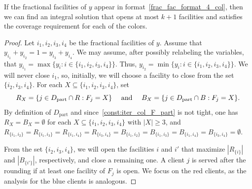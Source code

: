 \begin{lemma}
\label{lem:format4_col}
If the fractional facilities of $y$ appear in format~\ref{frac_fac_format_4_col}, then we can find an integral solution that opens at most $k+1$ facilities and satisfies the coverage requirement for each of the colors.
\end{lemma}
\begin{proof}
Let $i_1, i_2,i_3,i_4$ be the fractional facilities of $y$. Assume that $y_{i_1} + y_{i_2} = 1 = y_{i_3} + y_{i_4}$. We may assume, after possibly relabeling the variables, that $y_{i_1} = \max\{y_i : i \in \{i_1,i_2,i_3,i_4\}\}$. Thus, $y_{i_2} = \min\{y_i : i \in \{i_1,i_2,i_3,i_4\}\}$. We will never close $i_1$, so, initially, we will choose a facility to close from the set $\{i_{2}, i_{3},i_{4}\}$. For each $X \subseteq \{i_1,i_2,i_3,i_4\}$, set
\[R_X = \{j \in D_\text{part} \cap R : F_j = X\} \text{ \quad and \quad } B_X = \{j \in D_\text{part} \cap B : F_j = X\}.\]
By definition of $D_\text{part}$ and since~\eqref{const:iter_col_F_part} is not tight, one has $R_X = B_X = \emptyset$ for each $X \subseteq \{i_1,i_2,i_3,i_4\}$ with $|X| \geq 3$, and $R_{\{i_1,i_2\}} = R_{\{i_1,i_3\}} = R_{\{i_1,i_4\}} = R_{\{i_3,i_4\}} = B_{\{i_1,i_2\}} = B_{\{i_1,i_3\}} = B_{\{i_1,i_4\}} = B_{\{i_3,i_4\}} = \emptyset$.

From the set $\{i_2,i_3,i_4\}$, we will open the facilities $i$ and $i'$ that maximize $|R_{\{i\}}|$ and $|B_{\{i'\}}|$, respectively, and close a remaining one. A client $j$ is served after the rounding if at least one facility of $F_j$ is open. We focus on the red clients, as the analysis for the blue clients is analogous.


\end{proof}

